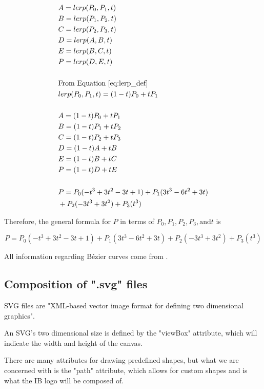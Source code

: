 \documentclass[letterpaper, 12pt]{article}
\begin{document}
\begingroup
\allowdisplaybreaks
\begin{align*}
     & A = lerp(P_0, P_1, t)
    \\
     & B = lerp(P_1, P_2, t)
    \\
     & C = lerp(P_2, P_3, t)
    \\
     & D = lerp(A, B, t)
    \\
     & E = lerp(B, C, t)
    \\
     & P = lerp(D, E, t)
    \\
    \\
     & \text{From Equation } \protect\ref*{eq:lerp_def}
    \\
     & lerp(P_0, P_1, t) = (1-t)P_0 + tP_1
    \\
    \\
     & A = (1-t)P_0 + tP_1
    \\
     & B = (1-t)P_1 + tP_2
    \\
     & C = (1-t)P_2 + tP_3
    \\
     & D = (1-t)A + tB
    \\
     & E = (1-t)B + tC
    \\
     & P = (1-t)D + tE
    \\
    \\
     & P = P_0(-t^3+3t^2-3t+1) + P_1(3t^3-6t^2+3t)
    \\
     & + P_2(-3t^3+3t^2) + P_3(t^3)
\end{align*}
\endgroup

Therefore, the general formula for \(P\) in terms of
\(P_0, P_1, P_2, P_3, \text{and} t\) is

\begin{equation} \label{eq:pFormula}
    P = P_0(-t^3+3t^2-3t+1) + P_1(3t^3-6t^2+3t) + P_2(-3t^3+3t^2) + P_3(t^3)
\end{equation}

All information regarding Bézier curves come from \cite{holmerBeautyBezierCurves2021}.

\subsection{Composition of ".svg" files}

SVG files are "XML-based vector image format for defining two dimensional
graphics"\cite{SVG2023}.

An SVG's two dimensional size is defined by the "viewBox" attribute,
which will indicate the width and height of the canvas.

There are many attributes for drawing predefined shapes, but what
we are concerned with is the "path" attribute, which allows for custom
shapes and is what the IB logo will be composed of.
\end{document}
